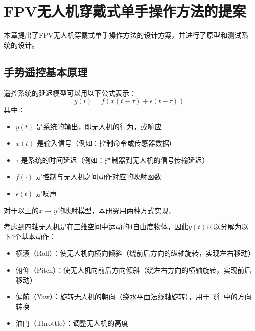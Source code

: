 \ifx\allfiles\undefined


\else
\fi

\section{FPV无人机穿戴式单手操作方法的提案}

本章提出了FPV无人机穿戴式单手操作方法的设计方案，并进行了原型和测试系统的设计。

\subsection{手势遥控基本原理}\label{label:section2.1}

遥控系统的延迟模型可以用以下公式表示：
\begin{equation}
    \label{formula:2.1}
    y(t)=f(x(t-\tau)+\epsilon(t-\tau))
\end{equation}
其中：

\begin{itemize}
    \item $y(t)$ 是系统的输出，即无人机的行为，或响应
    \item $x(t)$ 是输入信号（例如：控制命令或传感器数据）
    \item $\tau$ 是系统的时间延迟（例如：控制器到无人机的信号传输延迟）
    \item $f(\cdot)$ 是控制与无人机之间动作对应的映射函数
    \item $\epsilon(t)$ 是噪声
\end{itemize}

对于以上的$x\xrightarrow{}y$的映射模型，本研究用两种方式实现。

考虑到四轴无人机是在三维空间中运动的4自由度物体，因此$y(t)$可以分解为以下4个基本动作：
\begin{itemize}
    \item 横滚（Roll）：使无人机向横向倾斜（绕前后方向的纵轴旋转，实现左右移动）
    \item 俯仰（Pitch）：使无人机向前后方向倾斜（绕左右方向的横轴旋转，实现前后移动）
    \item 偏航（Yaw）：旋转无人机的朝向（绕水平面法线轴旋转），用于飞行中的方向转换
    \item 油门（Throttle）：调整无人机的高度
\end{itemize}


